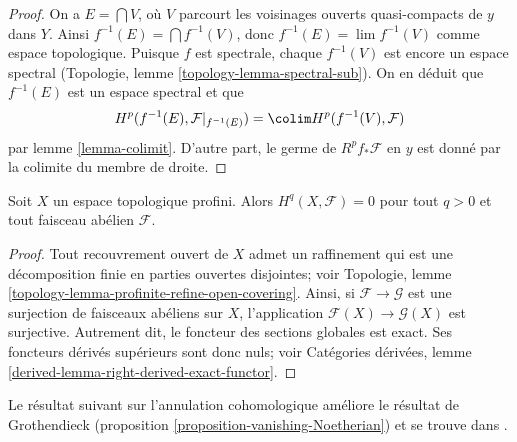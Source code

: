\begin{proof}

On a $E = \bigcap V$, où $V$ parcourt les voisinages ouverts quasi-compacts de $y$ dans $Y$. Ainsi $f^{-1}(E) = \bigcap f^{-1}(V)$, donc $f^{-1}(E) = \lim f^{-1}(V)$ comme espace topologique. Puisque $f$ est spectrale, chaque $f^{-1}(V)$ est encore un espace spectral (Topologie, lemme \ref{topology-lemma-spectral-sub}). On en déduit que $f^{-1}(E)$ est un espace spectral et que
$$
H^p(f^{-1}(E), \mathcal{F}|_{f^{-1}(E)}) =
\colim H^p(f^{-1}(V), \mathcal{F})
$$
par lemme \ref{lemma-colimit}. D'autre part, le germe de
$R^pf_*\mathcal{F}$ en $y$ est donné par la colimite du membre de droite.

\end{proof}

\begin{lemma}

\label{lemma-vanishing-for-profinite}
Soit $X$ un espace topologique profini. Alors $H^q(X, \mathcal{F}) = 0$ pour tout $q > 0$ et tout faisceau abélien $\mathcal{F}$.
\end{lemma}

\begin{proof}
Tout recouvrement ouvert de $X$ admet un raffinement qui est une décomposition finie en parties ouvertes disjointes; voir Topologie, lemme \ref{topology-lemma-profinite-refine-open-covering}. Ainsi, si $\mathcal{F} \to \mathcal{G}$ est une surjection de faisceaux abéliens sur $X$, l'application $\mathcal{F}(X) \to \mathcal{G}(X)$ est surjective. Autrement dit, le foncteur des sections globales est exact. Ses foncteurs dérivés supérieurs sont donc nuls; voir Catégories dérivées, lemme \ref{derived-lemma-right-derived-exact-functor}.
\end{proof}

\noindent
Le résultat suivant sur l'annulation cohomologique améliore le résultat de Grothendieck (proposition \ref{proposition-vanishing-Noetherian}) et se trouve dans \cite{Scheiderer}.

